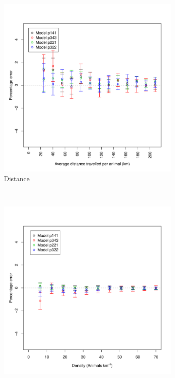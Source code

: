 \documentclass[a4paper,10pt,reqno,oneside]{amsart}
\begin{document}
\begin{figure}[t]
        \centering
        \begin{subfigure}[t]{0.5\textwidth}
                \centering
		\includegraphics[width=1\textwidth]{imgs/ResultsDistanceSubsample.pdf}
                \caption{Distance}
                \label{f:Distance}
        \end{subfigure}
        ~ 
        \begin{subfigure}[t]{0.5\textwidth}
                \centering
		\includegraphics[width=1\textwidth]{imgs/ResultsDensitySubsample.pdf}

\end{subfigure}
\end{figure}
\end{document}
